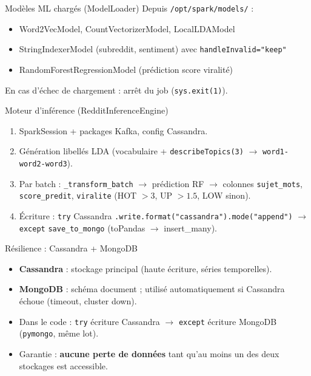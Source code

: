 \documentclass[11pt,aspectratio=169]{beamer}
\begin{document}
\begin{frame}{Modèles ML chargés (ModelLoader)}
  Depuis \texttt{/opt/spark/models/} :
  \begin{itemize}[leftmargin=*]
    \item Word2VecModel, CountVectorizerModel, LocalLDAModel
    \item StringIndexerModel (subreddit, sentiment) avec \texttt{handleInvalid="keep"}
    \item RandomForestRegressionModel (prédiction score viralité)
  \end{itemize}
  En cas d'échec de chargement : arrêt du job (\texttt{sys.exit(1)}).
\end{frame}

\begin{frame}{Moteur d'inférence (RedditInferenceEngine)}
  \begin{enumerate}[leftmargin=*]
    \item SparkSession + packages Kafka, config Cassandra.
    \item Génération libellés LDA (vocabulaire + \texttt{describeTopics(3)} $\rightarrow$ \texttt{word1-word2-word3}).
    \item Par batch : \texttt{\_transform\_batch} $\rightarrow$ prédiction RF $\rightarrow$ colonnes \texttt{sujet\_mots}, \texttt{score\_predit}, \texttt{viralite} (HOT $>3$, UP $>1.5$, LOW sinon).
    \item Écriture : \texttt{try} Cassandra \texttt{.write.format("cassandra").mode("append")} $\rightarrow$ \texttt{except} \texttt{save\_to\_mongo} (toPandas $\rightarrow$ insert\_many).
  \end{enumerate}
\end{frame}

\begin{frame}{Résilience : Cassandra + MongoDB}
  \begin{itemize}[leftmargin=*]
    \item \textbf{Cassandra} : stockage principal (haute écriture, séries temporelles).
    \item \textbf{MongoDB} : schéma document ; utilisé automatiquement si Cassandra échoue (timeout, cluster down).
    \item Dans le code : \texttt{try} écriture Cassandra $\rightarrow$ \texttt{except} écriture MongoDB (\texttt{pymongo}, même lot).
    \item Garantie : \textbf{aucune perte de données} tant qu'au moins un des deux stockages est accessible.
  \end{itemize}
\end{frame}
\end{document}
